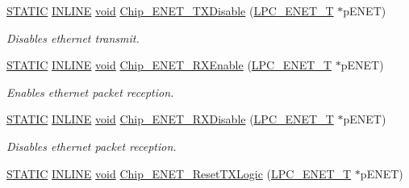 \begin{DoxyCompactItemize}
\hyperlink{group__LPC__Types__Public__Macros_ga10b2d890d871e1489bb02b7e70d9bdfb}{S\-T\-A\-T\-I\-C} \hyperlink{group__LPC__Types__Public__Types_ga2eb6f9e0395b47b8d5e3eeae4fe0c116}{I\-N\-L\-I\-N\-E} \hyperlink{Paradigm_2Tern__EE_2small_2portmacro_8h_a14d32f8130d3c0b212cfc751730b5b49}{void} \hyperlink{group__ENET__17XX__40XX_gaaf0d9ef785afa5a847431e86520430c9}{Chip\-\_\-\-E\-N\-E\-T\-\_\-\-T\-X\-Disable} (\hyperlink{structLPC__ENET__T}{L\-P\-C\-\_\-\-E\-N\-E\-T\-\_\-\-T} $\ast$p\-E\-N\-E\-T)
\begin{DoxyCompactList}\small\item\em Disables ethernet transmit. \end{DoxyCompactList}\item 
\hyperlink{group__LPC__Types__Public__Macros_ga10b2d890d871e1489bb02b7e70d9bdfb}{S\-T\-A\-T\-I\-C} \hyperlink{group__LPC__Types__Public__Types_ga2eb6f9e0395b47b8d5e3eeae4fe0c116}{I\-N\-L\-I\-N\-E} \hyperlink{Paradigm_2Tern__EE_2small_2portmacro_8h_a14d32f8130d3c0b212cfc751730b5b49}{void} \hyperlink{group__ENET__17XX__40XX_gaccc601f3393807fe6255771fb1c47a0b}{Chip\-\_\-\-E\-N\-E\-T\-\_\-\-R\-X\-Enable} (\hyperlink{structLPC__ENET__T}{L\-P\-C\-\_\-\-E\-N\-E\-T\-\_\-\-T} $\ast$p\-E\-N\-E\-T)
\begin{DoxyCompactList}\small\item\em Enables ethernet packet reception. \end{DoxyCompactList}\item 
\hyperlink{group__LPC__Types__Public__Macros_ga10b2d890d871e1489bb02b7e70d9bdfb}{S\-T\-A\-T\-I\-C} \hyperlink{group__LPC__Types__Public__Types_ga2eb6f9e0395b47b8d5e3eeae4fe0c116}{I\-N\-L\-I\-N\-E} \hyperlink{Paradigm_2Tern__EE_2small_2portmacro_8h_a14d32f8130d3c0b212cfc751730b5b49}{void} \hyperlink{group__ENET__17XX__40XX_gaef60a4790dcce43254081ea7fe5a22d4}{Chip\-\_\-\-E\-N\-E\-T\-\_\-\-R\-X\-Disable} (\hyperlink{structLPC__ENET__T}{L\-P\-C\-\_\-\-E\-N\-E\-T\-\_\-\-T} $\ast$p\-E\-N\-E\-T)
\begin{DoxyCompactList}\small\item\em Disables ethernet packet reception. \end{DoxyCompactList}\item 
\hyperlink{group__LPC__Types__Public__Macros_ga10b2d890d871e1489bb02b7e70d9bdfb}{S\-T\-A\-T\-I\-C} \hyperlink{group__LPC__Types__Public__Types_ga2eb6f9e0395b47b8d5e3eeae4fe0c116}{I\-N\-L\-I\-N\-E} \hyperlink{Paradigm_2Tern__EE_2small_2portmacro_8h_a14d32f8130d3c0b212cfc751730b5b49}{void} \hyperlink{group__ENET__17XX__40XX_ga23cc17a06ee9e42b4f1327cd792a2a8e}{Chip\-\_\-\-E\-N\-E\-T\-\_\-\-Reset\-T\-X\-Logic} (\hyperlink{structLPC__ENET__T}{L\-P\-C\-\_\-\-E\-N\-E\-T\-\_\-\-T} $\ast$p\-E\-N\-E\-T)

\end{DoxyCompactItemize}
